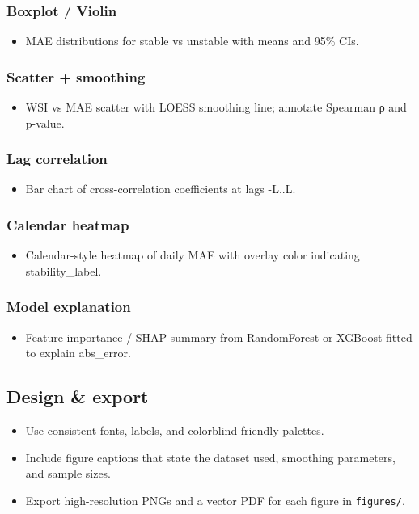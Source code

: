 \documentclass[11pt,a4paper]{article}
\begin{document}
\subsubsection{Boxplot / Violin}
\begin{itemize}
    \item MAE distributions for stable vs unstable with means and 95\% CIs.
\end{itemize}

\subsubsection{Scatter + smoothing}
\begin{itemize}
    \item WSI vs MAE scatter with LOESS smoothing line; annotate Spearman ρ and p-value.
\end{itemize}

\subsubsection{Lag correlation}
\begin{itemize}
    \item Bar chart of cross-correlation coefficients at lags -L..L.
\end{itemize}

\subsubsection{Calendar heatmap}
\begin{itemize}
    \item Calendar-style heatmap of daily MAE with overlay color indicating stability\_label.
\end{itemize}

\subsubsection{Model explanation}
\begin{itemize}
    \item Feature importance / SHAP summary from RandomForest or XGBoost fitted to explain abs\_error.
\end{itemize}

\subsection{Design \& export}
\begin{itemize}
    \item Use consistent fonts, labels, and colorblind-friendly palettes.
    \item Include figure captions that state the dataset used, smoothing parameters, and sample sizes.
    \item Export high-resolution PNGs and a vector PDF for each figure in \texttt{figures/}.
\end{itemize}
\end{document}
